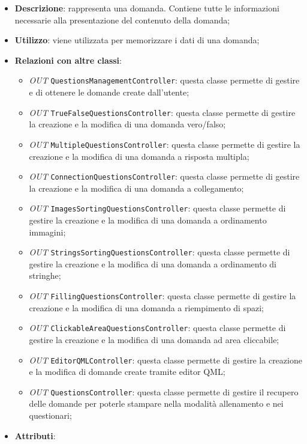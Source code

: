 		\begin{itemize}
			\item \textbf{Descrizione}: rappresenta una domanda. Contiene tutte le informazioni necessarie alla presentazione del contenuto della domanda;
			\item \textbf{Utilizzo}: viene utilizzata per memorizzare i dati di una domanda;
			\item \textbf{Relazioni con altre classi}: 
			\begin{itemize}
				\item \textit{OUT} \texttt{QuestionsManagementController}: questa classe permette di gestire e di ottenere le domande create dall'utente;
				\item \textit{OUT} \texttt{TrueFalseQuestionsController}: questa classe permette di gestire la creazione e la modifica di una domanda vero/falso;
				\item \textit{OUT} \texttt{MultipleQuestionsController}: questa classe permette di gestire la creazione e la modifica di una domanda a risposta multipla; 
				\item \textit{OUT} \texttt{ConnectionQuestionsController}: questa classe permette di gestire la creazione e la modifica di una domanda a collegamento;
				\item \textit{OUT} \texttt{ImagesSortingQuestionsController}: questa classe permette di gestire la creazione e la modifica di una domanda a ordinamento immagini;
				\item \textit{OUT} \texttt{StringsSortingQuestionsController}: questa classe permette di gestire la creazione e la modifica di una domanda a ordinamento di stringhe;
				\item \textit{OUT} \texttt{FillingQuestionsController}: questa classe permette di gestire la creazione e la modifica di una domanda a riempimento di spazi; 
				\item \textit{OUT} \texttt{ClickableAreaQuestionsController}: questa classe permette di gestire la creazione e la modifica di una domanda ad area cliccabile;
				\item \textit{OUT} \texttt{EditorQMLController}: questa classe permette di gestire la creazione e la modifica di domande create tramite editor QML;
				\item \textit{OUT} \texttt{QuestionsController}: questa classe permette di gestire il recupero delle domande per poterle stampare nella modalità allenamento e nei questionari;
			\end{itemize}
			\item \textbf{Attributi}: 

\end{itemize}
